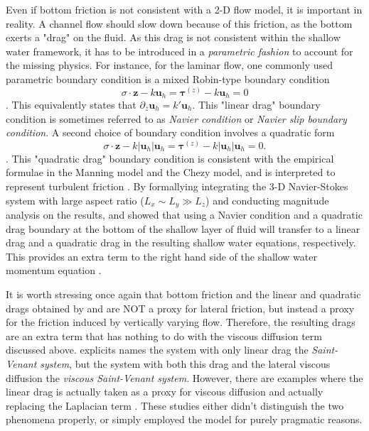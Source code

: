 Even if bottom friction is not consistent with a 2-D flow model, it is important in reality. A channel flow should slow down because of this friction, as the bottom exerts a "drag" on the fluid. As this drag is not consistent within the shallow water framework, it has to be introduced in a \textit{parametric fashion} to account for the missing physics. For instance, for the laminar flow, one commonly used parametric boundary condition is a mixed Robin-type boundary condition
\[
    \sigma \cdot \mathbf{z} - k \mathbf{u}_h = \bm{\tau}^{(z)} - k \mathbf{u}_h = 0
\]
\parencite{gerbeau_derivation_2001}. This equivalently states that $\partial_z \mathbf{u}_h = k' \mathbf{u}_h$. This "linear drag" boundary condition is sometimes referred to as \textit{Navier condition} or \textit{Navier slip boundary condition}. A second choice of boundary condition involves a quadratic form
\[
    \sigma \cdot \mathbf{z} - k |\mathbf{u}_h| \mathbf{u}_h = \bm{\tau}^{(z)} - k |\mathbf{u}_h| \mathbf{u}_h = 0.
\]
\parencite{marche_derivation_2007,krylova_derivation_2017}. This "quadratic drag" boundary condition is consistent with the empirical formulae in the Manning model and the Chezy model, and is interpreted to represent turbulent friction \parencite{marche_derivation_2007}. By formallying integrating the 3-D Navier-Stokes system with large aspect ratio ($L_x \sim L_y \gg L_z$) and conducting magnitude analysis on the results, \textcite{gerbeau_derivation_2001} and \textcite{marche_derivation_2007} showed that using a Navier condition and a quadratic drag boundary at the bottom of the shallow layer of fluid will transfer to a linear drag and a quadratic drag in the resulting shallow water equations, respectively. This provides an extra term to the right hand side of the shallow water momentum equation \parencite{dong_robust_2020}.

It is worth stressing once again that bottom friction and the linear and quadratic drags obtained by \textcite{gerbeau_derivation_2001} and \textcite{marche_derivation_2007} are NOT a proxy for lateral friction, but instead a proxy for the friction induced by vertically varying flow. Therefore, the resulting drags are an extra term that has nothing to do with the viscous diffusion term discussed above. \textcite{gerbeau_derivation_2001} explicits names the system with only linear drag the \textit{Saint-Venant system}, but the system with both this drag and the lateral viscous diffusion the \textit{viscous Saint-Venant system}. However, there are examples where the linear drag is actually taken as a proxy for viscous diffusion and actually replacing the Laplacian term \parencite{salmon_simplified_1986,hollerbach_modal_1991}. These studies either didn't distinguish the two phenomena properly, or simply employed the model for purely pragmatic reasons.


